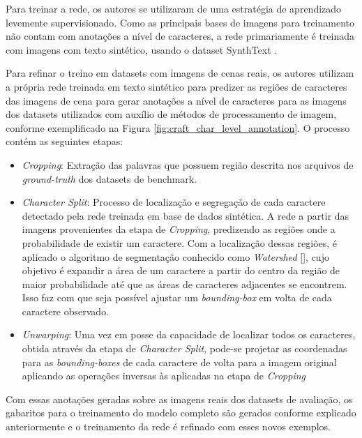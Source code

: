Para treinar a rede, os autores se utilizaram de uma estratégia de aprendizado levemente supervisionado. Como as principais bases de imagens para treinamento não contam com anotações a nível de caracteres, a rede primariamente é treinada com imagens com texto sintético, usando o dataset SynthText .

Para refinar o treino em datasets com imagens de cenas reais, os autores utilizam a própria rede treinada em texto sintético para predizer as regiões de caracteres das imagens de cena para gerar anotações a nível de caracteres para as imagens dos datasets utilizados com auxílio de métodos de processamento de imagem, conforme exemplificado na Figura \ref{fig:craft_char_level_annotation}. O processo contém as seguintes etapas:

\begin{itemize}
    \item \textit{Cropping}: Extração das palavras que possuem região descrita nos arquivos de \textit{ground-truth} dos datasets de benchmark.
    \item \textit{Character Split}: Processo de localização e segregação de cada caractere detectado pela rede treinada em base de dados sintética. A rede a partir das imagens provenientes da etapa de \textit{Cropping}, predizendo as regiões onde a probabilidade de existir um caractere. Com a localização dessas regiões, é aplicado o algoritmo de segmentação conhecido como \textit{Watershed} [], cujo objetivo é expandir a área de um caractere a partir do centro da região de maior probabilidade até que as áreas de caracteres adjacentes se encontrem. Isso faz com que seja possível ajustar um \textit{bounding-box} em volta de cada caractere observado.
    \item \textit{Unwarping}: Uma vez em posse da capacidade de localizar todos os caracteres, obtida através da etapa de \textit{Character Split}, pode-se projetar as coordenadas para as \textit{bounding-boxes} de cada caractere de volta para a imagem original aplicando as operações inversas às aplicadas na etapa de \textit{Cropping}
\end{itemize}

Com essas anotações geradas sobre as imagens reais dos datasets de avaliação, os gabaritos para o treinamento do modelo completo são gerados conforme explicado anteriormente e o treinamento da rede é refinado com esses novos exemplos.

